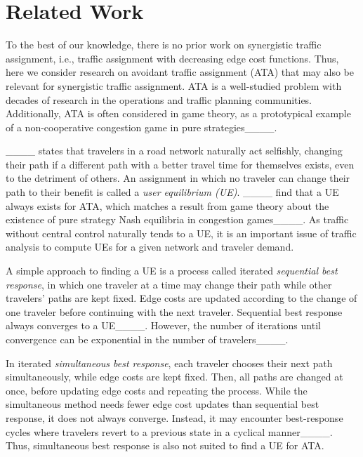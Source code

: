 \section{Related Work}
To the best of our knowledge, there is no prior work on synergistic traffic assignment, i.e., traffic assignment with decreasing edge cost functions.
    Thus, here we consider research on avoidant traffic assignment (ATA) that may also be relevant for synergistic traffic assignment.
    ATA is a well-studied problem with decades of research in the operations and traffic planning communities.
    Additionally, ATA is often considered in game theory, as a prototypical example of a non-cooperative congestion game in pure strategies____.

    ____ states that travelers in a road network naturally act selfishly, changing their path if a different path with a better travel time for themselves exists, even to the detriment of others.
    An assignment in which no traveler can change their path to their benefit is called a \emph{user equilibrium (UE)}.
    ____ find that a UE always exists for ATA, which matches a result from game theory about the existence of pure strategy Nash equilibria in congestion games____.
    As traffic without central control naturally tends to a UE, it is an important issue of traffic analysis to compute UEs for a given network and traveler demand.

    A simple approach to finding a UE is a process called iterated \emph{sequential best response}, in which one traveler at a time may change their path while other travelers' paths are kept fixed.
    Edge costs are updated according to the change of one traveler before continuing with the next traveler.
    Sequential best response always converges to a UE____.
    However, the number of iterations until convergence can be exponential in the number of travelers____.

    In iterated \emph{simultaneous best response}, each traveler chooses their next path simultaneously, while edge costs are kept fixed.
    Then, all paths are changed at once, before updating edge costs and repeating the process.
    While the simultaneous method needs fewer edge cost updates than sequential best response, it does not always converge.
    Instead, it may encounter best-response cycles where travelers revert to a previous state in a cyclical manner____.
    Thus, simultaneous best response is also not suited to find a UE for ATA.

